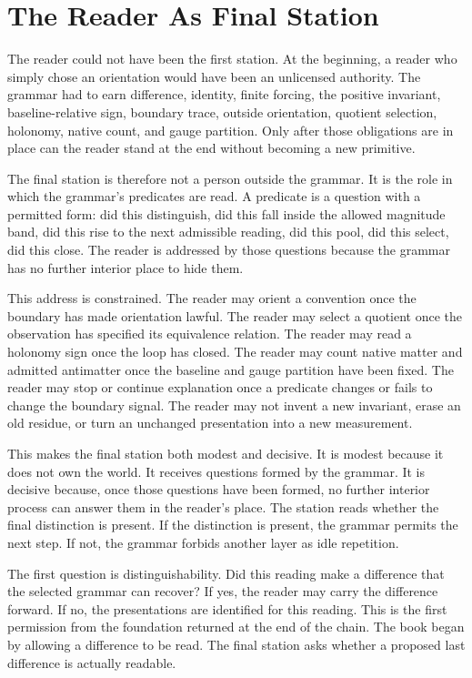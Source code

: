 \section{The Reader As Final Station}

The reader could not have been the first station. At the beginning, a reader
who simply chose an orientation would have been an unlicensed authority. The
grammar had to earn difference, identity, finite forcing, the positive
invariant, baseline-relative sign, boundary trace, outside orientation,
quotient selection, holonomy, native count, and gauge partition. Only after
those obligations are in place can the reader stand at the end without
becoming a new primitive.

The final station is therefore not a person outside the grammar. It is the
role in which the grammar's predicates are read. A predicate is a question
with a permitted form: did this distinguish, did this fall inside the
allowed magnitude band, did this rise to the next admissible reading, did
this pool, did this select, did this close. The reader is addressed by those
questions because the grammar has no further interior place to hide them.

This address is constrained. The reader may orient a convention once the
boundary has made orientation lawful. The reader may select a quotient once
the observation has specified its equivalence relation. The reader may read a
holonomy sign once the loop has closed. The reader may count native matter
and admitted antimatter once the baseline and gauge partition have been
fixed. The reader may stop or continue explanation once a predicate changes
or fails to change the boundary signal. The reader may not invent a new
invariant, erase an old residue, or turn an unchanged presentation into a
new measurement.

This makes the final station both modest and decisive. It is modest because
it does not own the world. It receives questions formed by the grammar. It
is decisive because, once those questions have been formed, no further
interior process can answer them in the reader's place. The station reads
whether the final distinction is present. If the distinction is present, the
grammar permits the next step. If not, the grammar forbids another layer as
idle repetition.

The first question is distinguishability. Did this reading make a difference
that the selected grammar can recover? If yes, the reader may carry the
difference forward. If no, the presentations are identified for this
reading. This is the first permission from the foundation returned at the
end of the chain. The book began by allowing a difference to be read. The
final station asks whether a proposed last difference is actually readable.

